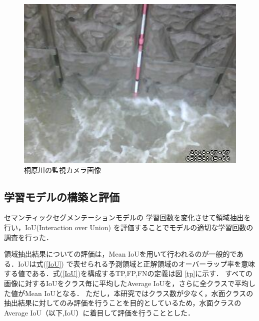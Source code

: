 \vspace{20mm}
\begin{figure}[h] 
  \begin{center}
    \includegraphics[width=130mm]{image/070001.jpg}
  \end{center}
  \caption{桐原川の監視カメラ画像}
  \label{togegawa}
\end{figure}
\clearpage

\subsection{学習モデルの構築と評価}
\label{5.1}
セマンティックセグメンテーションモデルの
学習回数を変化させて領域抽出を行い，IoU(Interaction over Union)\cite{IoU}
を評価することでモデルの適切な学習回数の調査を行った．

領域抽出結果についての評価は，Mean IoUを用いて行われるのが一般的である．IoUは式(\ref{IoU})
で表せられる予測領域と正解領域のオーバーラップ率を意味する値である．式(\ref{IoU})を構成するTP,FP,FNの定義は図
\ref{tp}に示す．
すべての画像に対するIoUをクラス毎に平均したAverage IoUを，さらに全クラスで平均した値がMean IoUとなる．
ただし，本研究ではクラス数が少なく，水面クラスの抽出結果に対してのみ評価を行うことを目的としているため，水面クラスの
Average IoU（以下,IoU）に着目して評価を行うこととした．

